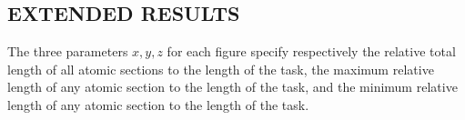 \documentclass[letter]{sig-alternate}
\begin{document}
\subsection{EXTENDED RESULTS}
The three parameters $x,y,z$ for each figure specify respectively the relative total length of all atomic sections to the length of the task, the maximum relative length of any atomic section to the length of the task, and the minimum relative length of any atomic section to the length of the task.
\begin{figure}[htbp]
\centering
{}
\end{figure}
\end{document}
